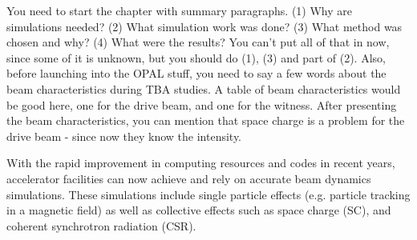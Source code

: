 \documentclass{iitthesis}
\newcommand{\lsnote}[1]{\textsf{{\color{violet}{ LS note:}   #1 }}}
\begin{document}




\label{sec:code}

\lsnote{You need to start the chapter with summary paragraphs.  (1) Why are simulations needed?  (2) What simulation work was done?  (3) What method was chosen and why?  (4) What were the results?  You can't put  all of that in now, since some of it is unknown, but you should do (1), (3) and part of (2).  Also, before launching into the OPAL stuff, you need to say a few words about the beam characteristics during TBA studies.  A table of beam characteristics would be good here, one for the drive beam, and one for the witness.  After presenting the beam characteristics, you can mention that space charge is a problem for the drive beam - since now they know the intensity.}

With  the  rapid  improvement  in  computing  resources  and  codes  in  recent  years,  
accelerator  facilities  can  now achieve and rely on accurate beam dynamics simulations. 
These  simulations  include  single  particle  effects  (e.g. particle tracking in a magnetic field) as well as collective effects  such  as  space  charge  (SC),  
and  coherent  synchrotron  radiation  (CSR).
\end{document}
